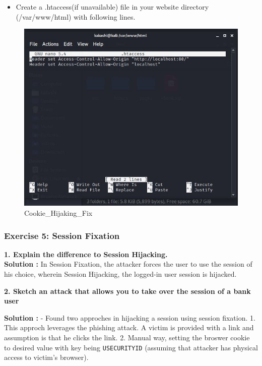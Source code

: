 \begin{itemize}
\tightlist
\item
  Create a .htaccess(if unavailable) file in your website directory
  (/var/www/html) with following lines.
\end{itemize}

\begin{figure}
\centering
\includegraphics{images/task2/SameOrigin_htaccess.JPG}
\caption{Cookie\_Hijaking\_Fix}
\end{figure}

\hypertarget{exercise-5-session-fixation}{%
\subsubsection{Exercise 5: Session
Fixation}\label{exercise-5-session-fixation}}

\textbf{1. Explain the difference to Session Hijacking.}\\
\textbf{Solution :} In Session Fixation, the attacker forces the user to
use the session of his choice, wherein Session Hijacking, the logged-in
user session is hijacked.

\textbf{2. Sketch an attack that allows you to take over the session of
a bank user}

\textbf{Solution :} - Found two approches in hijacking a session using
session fixation. 1. This approch leverages the phishing attack. A
victim is provided with a link and assumption is that he clicks the
link. 2. Manual way, setting the broswer cookie to desired value with
key being \texttt{USECURITYID} (assuming that attacker has physical
access to victim's browser).

